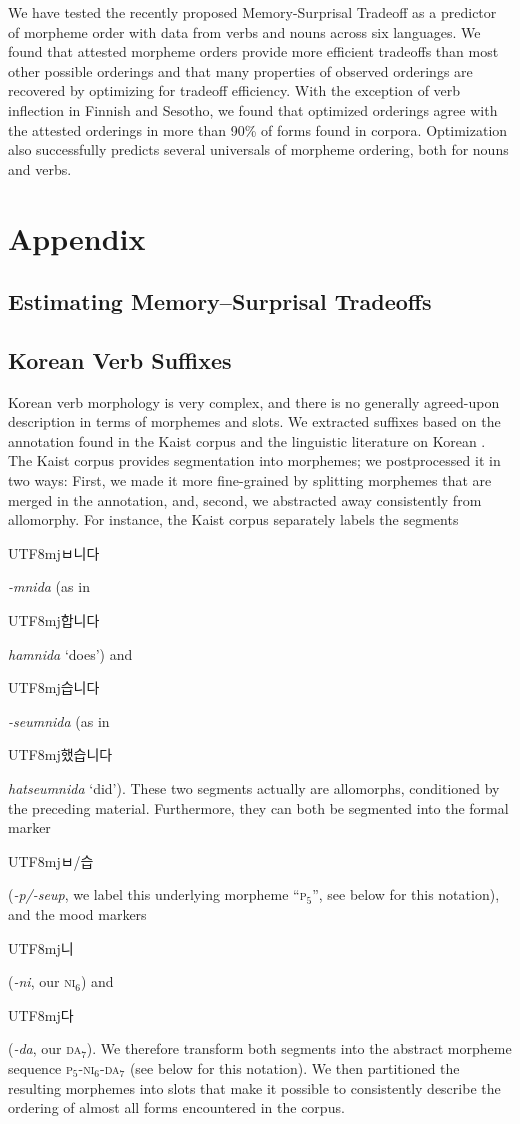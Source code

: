 \documentclass[11pt,letterpaper]{article}
\newcommand{\korean}[1]{\begin{CJK}{UTF8}{mj}#1\end{CJK}}
\begin{document}
We have tested the recently proposed Memory-Surprisal Tradeoff as a predictor of morpheme order with data from verbs and nouns across six languages.
We found that attested morpheme orders provide more efficient tradeoffs than most other possible orderings and that many properties of observed orderings are recovered by optimizing for tradeoff efficiency.
With the exception of verb inflection in Finnish and Sesotho, we found that optimized orderings agree with the attested orderings in more than 90\% of forms found in corpora.
Optimization also successfully predicts several universals of morpheme ordering, both for nouns and verbs.




\appendix

\section{Appendix}


\subsection{Estimating Memory--Surprisal Tradeoffs}


\subsection{Korean Verb Suffixes}

Korean verb morphology is very complex, and there is no generally agreed-upon description in terms of morphemes and slots.
We extracted suffixes based on the annotation found in the Kaist corpus and the linguistic literature on Korean \citep{yeon2010korean}.
The Kaist corpus provides segmentation into morphemes; we postprocessed it in two ways:
First, we made it more fine-grained by splitting morphemes that are merged in the annotation, and, second, we abstracted away consistently from allomorphy.
For instance, the Kaist corpus separately labels the segments \korean{ㅂ니다} \textit{-mnida} (as in \korean{합니다} \textit{hamnida} `does') and \korean{습니다} \textit{-seumnida} (as in \korean{했습니다} \textit{hatseumnida} `did').
These two segments actually are allomorphs, conditioned by the preceding material.
Furthermore, they can both be segmented into the formal marker \korean{ㅂ/습} (\textit{-p/-seup}, we label this underlying morpheme ``\textsc{p}$_5$'', see below for this notation), and the mood markers \korean{니} (\textit{-ni}, our \textsc{ni}$_6$) and \korean{다} (\textit{-da}, our \textsc{da}$_7$).
We therefore transform both segments into the abstract morpheme sequence \textsc{p}$_5$-\textsc{ni}$_6$-\textsc{da}$_7$ (see below for this notation).
We then partitioned the resulting morphemes into slots that make it possible to consistently describe the ordering of almost all forms encountered in the corpus.
\end{document}
